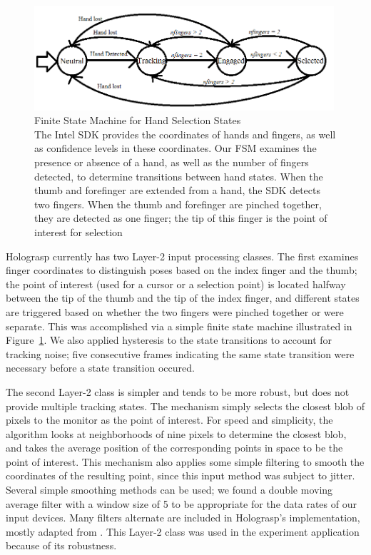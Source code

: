 \documentclass[pageno]{jpaper}
\begin{document}
\begin{figure}[h]
\centering
\includegraphics[width=0.99\textwidth]{figures/fsm.png}
\caption{Finite State Machine for Hand Selection States\\
The Intel SDK provides the coordinates of hands and fingers, as well as confidence levels in these coordinates. Our FSM
examines the presence or absence of a hand, as well as the number of fingers detected, to determine transitions between
hand states. When the thumb and forefinger are extended from a hand, the SDK detects two fingers. 
When the thumb and forefinger are pinched together, they are detected as one finger; the tip of this finger is the point
of interest for selection}
\label{fig:fsm}
\end{figure}

Holograsp currently has two Layer-2 input processing classes. The first examines finger coordinates to distinguish poses based
on the index finger and the thumb; the point of interest (used for a cursor or a selection point) is located halfway between the tip
of the thumb and the tip of the index finger, and different states are triggered based on whether the two fingers were pinched
together or were separate. This was accomplished via a simple finite state machine illustrated in Figure~\ref{fig:fsm}. We also
applied hysteresis to the state transitions to account for tracking noise; five consecutive frames indicating the same state transition
were necessary before a state transition occured.

The second Layer-2 class is simpler and tends to be more robust, but does not provide multiple tracking states. The mechanism simply selects the closest blob of pixels to the monitor
as the point of interest. For speed and simplicity, the algorithm looks at neighborhoods of nine pixels to determine the closest blob,
and takes the average position of the corresponding points in space to be the point of interest. This mechanism also applies some simple filtering to
smooth the coordinates of the resulting point, since this input method was subject to jitter. Several simple
smoothing methods can be used; we found a double moving average filter with a window size of 5 to be appropriate for the data rates of
our input devices. Many filters alternate are included in Holograsp's implementation, mostly adapted from \cite{brown2004smoothing}. This Layer-2 class was
used in the experiment application because of its robustness.
\end{document}
